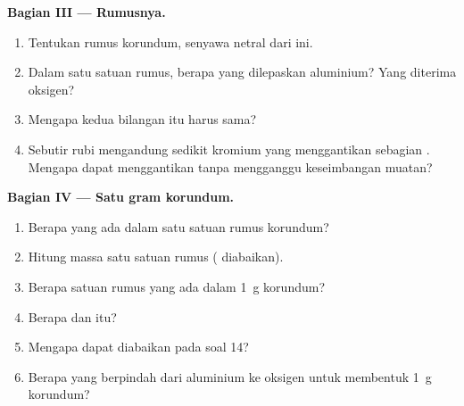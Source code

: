 \begin{problem}
\medskip
\noindent\textbf{Bagian III --- Rumusnya.}
\begin{enumerate}[resume]
  \item Tentukan rumus korundum, senyawa netral dari  ini.
  \item Dalam satu satuan rumus, berapa  yang dilepaskan 
        aluminium? Yang diterima  oksigen?
  \item Mengapa kedua bilangan itu harus sama?
  \item Sebutir rubi mengandung sedikit  kromium  yang
        menggantikan sebagian . Mengapa   dapat
        menggantikan   tanpa mengganggu keseimbangan
        muatan?
\end{enumerate}

\medskip
\noindent\textbf{Bagian IV --- Satu gram korundum.}
\begin{enumerate}[resume]
  \item Berapa  yang ada dalam satu satuan rumus korundum?
  \item Hitung massa satu satuan rumus ( diabaikan).
  \item Berapa satuan rumus yang ada dalam \qty{1}{g} korundum?
  \item Berapa   dan   itu?
  \item Mengapa  dapat diabaikan pada soal 14?
  \item Berapa  yang berpindah dari aluminium ke oksigen untuk
        membentuk \qty{1}{g} korundum?
\end{enumerate}
\end{problem}
